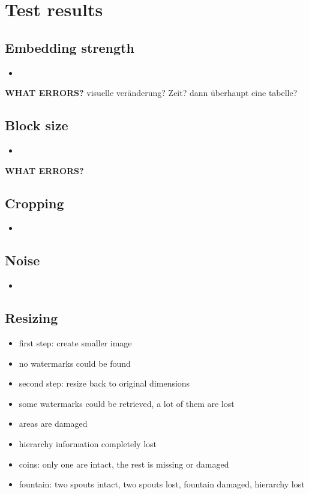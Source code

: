 \section{Test results}

\subsection{Embedding strength}
\begin{itemize}
    \item
\end{itemize}

\textbf{WHAT ERRORS?}
visuelle veränderung?
Zeit?
dann überhaupt eine tabelle?

\subsection{Block size}
\begin{itemize}
    \item
\end{itemize}

\textbf{WHAT ERRORS?}


\subsection{Cropping}
\begin{itemize}
    \item
\end{itemize}

\subsection{Noise}
\begin{itemize}
    \item 
\end{itemize}

\subsection{Resizing}
\begin{itemize}
    \item first step: create smaller image
    \item no watermarks could be found

    \item second step: resize back to original dimensions
    \item some watermarks could be retrieved, a lot of them are lost
    \item areas are damaged
    \item hierarchy information completely lost

    \item coins: only one are intact, the rest is missing or damaged
    \item fountain: two spouts intact, two spouts lost, fountain damaged, hierarchy lost
\end{itemize}

